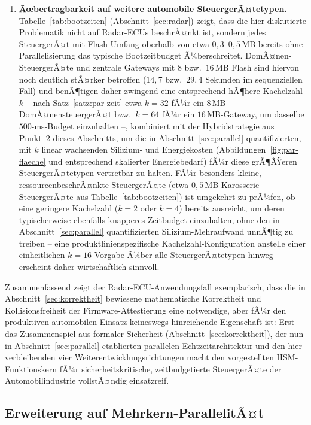﻿\documentclass[a4paper,12pt]{article}
\theoremstyle{definition}
\begin{document}
\begin{enumerate}
	\item \textbf{Ãœbertragbarkeit auf weitere automobile SteuergerÃ¤tetypen.} Tabelle~\ref{tab:bootzeiten} (Abschnitt~\ref{sec:radar}) zeigt, dass die hier diskutierte Problematik nicht auf Radar-ECUs beschrÃ¤nkt ist, sondern jedes SteuergerÃ¤t mit Flash-Umfang oberhalb von etwa $0{,}3$--$0{,}5$\,MB bereits ohne Parallelisierung das typische Bootzeitbudget Ã¼berschreitet. DomÃ¤nen-SteuergerÃ¤te und zentrale Gateways mit $8$ bzw.\ $16$\,MB Flash sind hiervon noch deutlich stÃ¤rker betroffen ($14{,}7$ bzw.\ $29{,}4$ Sekunden im sequenziellen Fall) und benÃ¶tigen daher zwingend eine entsprechend hÃ¶here Kachelzahl $k$ -- nach Satz~\ref{satz:par-zeit} etwa $k=32$ fÃ¼r ein $8$\,MB-DomÃ¤nensteuergerÃ¤t bzw.\ $k=64$ fÃ¼r ein $16$\,MB-Gateway, um dasselbe $500$-ms-Budget einzuhalten --, kombiniert mit der Hybridstrategie aus Punkt~2 dieses Abschnitts, um die in Abschnitt~\ref{sec:parallel} quantifizierten, mit $k$ linear wachsenden Silizium- und Energiekosten (Abbildungen~\ref{fig:par-flaeche} und entsprechend skalierter Energiebedarf) fÃ¼r diese grÃ¶ÃŸeren SteuergerÃ¤tetypen vertretbar zu halten. FÃ¼r besonders kleine, ressourcenbeschrÃ¤nkte SteuergerÃ¤te (etwa $0{,}5$\,MB-Karosserie-SteuergerÃ¤te aus Tabelle~\ref{tab:bootzeiten}) ist umgekehrt zu prÃ¼fen, ob eine geringere Kachelzahl ($k=2$ oder $k=4$) bereits ausreicht, um deren typischerweise ebenfalls knapperes Zeitbudget einzuhalten, ohne den in Abschnitt~\ref{sec:parallel} quantifizierten Silizium-Mehraufwand unnÃ¶tig zu treiben -- eine produktlinienspezifische Kachelzahl-Konfiguration anstelle einer einheitlichen $k=16$-Vorgabe Ã¼ber alle SteuergerÃ¤tetypen hinweg erscheint daher wirtschaftlich sinnvoll.
\end{enumerate}

Zusammenfassend zeigt der Radar-ECU-Anwendungsfall exemplarisch, dass die in Abschnitt~\ref{sec:korrektheit} bewiesene mathematische Korrektheit und Kollisionsfreiheit der Firmware-Attestierung eine notwendige, aber fÃ¼r den produktiven automobilen Einsatz keineswegs hinreichende Eigenschaft ist: Erst das Zusammenspiel aus formaler Sicherheit (Abschnitt~\ref{sec:korrektheit}), der nun in Abschnitt~\ref{sec:parallel} etablierten parallelen Echtzeitarchitektur und den hier verbleibenden vier Weiterentwicklungsrichtungen macht den vorgestellten HSM-Funktionskern fÃ¼r sicherheitskritische, zeitbudgetierte SteuergerÃ¤te der Automobilindustrie vollstÃ¤ndig einsatzreif.

\subsection{Erweiterung auf Mehrkern-ParallelitÃ¤t}
\end{document}
